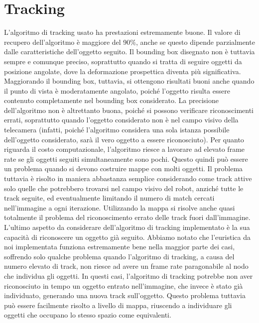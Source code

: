 \section{Tracking}
L'algoritmo di tracking usato ha prestazioni estremamente buone. Il valore di recupero dell'algoritmo è maggiore del 90\%, anche se questo dipende parzialmente dalle caratteristiche dell'oggetto seguito. Il bounding box disegnato non è tuttavia sempre e comunque preciso, soprattutto quando si tratta di seguire oggetti da posizione angolate, dove la deformazione prospettica diventa più significativa. Maggiorando il bounding box, tuttavia, si ottengono risultati buoni anche quando il punto di vista è moderatamente angolato, poiché l'oggetto risulta essere contenuto completamente nel bounding box considerato.
La precisione dell'algoritmo non è altrettanto buona, poiché si possono verificare riconoscimenti errati, soprattutto quando l'oggetto considerato non è nel campo visivo della telecamera (infatti, poiché l'algoritmo considera una sola istanza possibile dell'oggetto considerato, sarà il vero oggetto a essere riconosciuto).
Per quanto riguarda il costo computazionale, l'algoritmo riesce a lavorare ad elevato frame rate se gli oggetti seguiti simultaneamente sono pochi. Questo quindi può essere un problema quando si devono costruire mappe con molti oggetti. Il problema tuttavia è risolto in maniera abbastanza semplice considerando come track attive solo quelle che potrebbero trovarsi nel campo visivo del robot, anziché tutte le track seguite, ed eventualmente limitando il numero di match cercati nell'immagine a ogni iterazione. Utilizzando la mappa si risolve anche quasi totalmente il problema del riconoscimento errato delle track fuori dall'immagine.
L'ultimo aspetto da considerare dell'algoritmo di tracking implementato è la sua capacità di riconoscere un oggetto già seguito.
Abbiamo notato che l'euristica da noi implementata funziona estremamente bene nella maggior parte dei casi, soffrendo solo qualche problema quando l'algoritmo di tracking, a causa del numero elevato di track, non riesce ad avere un frame rate paragonabile al nodo che individua gli oggetti. In questi casi, l'algoritmo di tracking potrebbe non aver riconosciuto in tempo un oggetto entrato nell'immagine, che invece è stato già individuato, generando una nuova track sull'oggetto. Questo problema tuttavia può essere facilmente risolto a livello di mappa, riuscendo a individuare gli oggetti che occupano lo stesso spazio come equivalenti.
